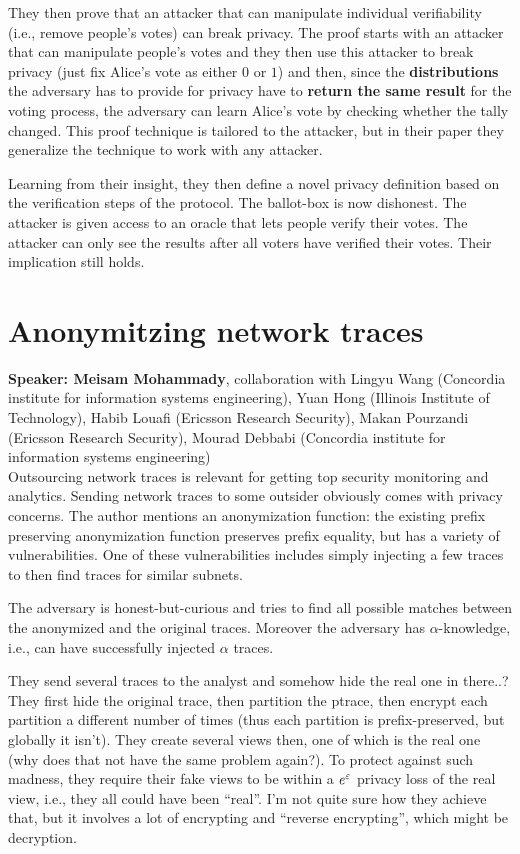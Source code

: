 \documentclass{article}
\begin{document}
They then prove that an attacker that can manipulate individual verifiability (i.e., remove people's votes) can break privacy. The proof starts with an attacker that can manipulate people's votes and they then use this attacker to break privacy (just fix Alice's vote as either $0$ or $1$) and then, since the \textbf{distributions} the adversary has to provide for privacy have to \textbf{return the same result} for the voting process, the adversary can learn Alice's vote by checking whether the tally changed. This proof technique is tailored to the attacker, but in their paper they generalize the technique to work with any attacker.

Learning from their insight, they then define a novel privacy definition based on the verification steps of the protocol. The ballot-box is now dishonest. The attacker is given access to an oracle that lets people verify their votes. The attacker can only see the results after all voters have verified their votes. Their implication still holds.



\section{Anonymitzing network traces}
\noindent\textbf{Speaker: Meisam Mohammady}, collaboration with Lingyu Wang (Concordia institute for information systems engineering), Yuan Hong (Illinois Institute of Technology), Habib Louafi (Ericsson Research Security), Makan Pourzandi (Ericsson Research Security), Mourad Debbabi (Concordia institute for information systems engineering)\\

Outsourcing network traces is relevant for getting top security monitoring and analytics. Sending network traces to some outsider obviously comes with privacy concerns.
The author mentions an anonymization function: the existing prefix preserving anonymization function preserves prefix equality, but has a variety of vulnerabilities. One of these vulnerabilities includes simply injecting a few traces to then find traces for similar subnets.

The adversary is honest-but-curious and tries to find all possible matches between the anonymized and the original traces. Moreover the adversary has $\alpha$-knowledge, i.e., can have successfully injected $\alpha$ traces.

They send several traces to the analyst and somehow hide the real one in there..?
They first hide the original trace, then partition the ptrace, then encrypt each partition a different number of times (thus each partition is prefix-preserved, but globally it isn't). They create several views then, one of which is the real one (why does that not have the same problem again?). To protect against such madness, they require their fake views to be within a $e^\varepsilon$ privacy loss of the real view, i.e., they all could have been ``real''. I'm not quite sure how they achieve that, but it involves a lot of encrypting and ``reverse encrypting'', which might be decryption.
\end{document}
